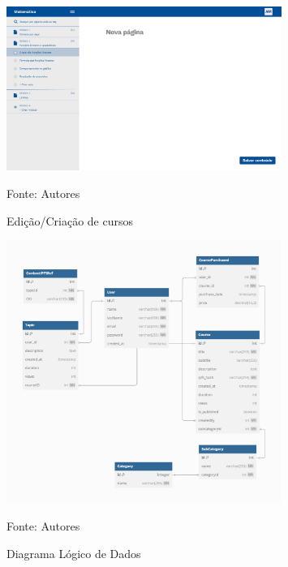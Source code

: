 \begin{apendicesenv}
    \begin{figure}[h]
        \centering
        \caption{Edição/Criação de cursos}
        \includegraphics[width=0.8\textwidth]{figuras/Criando_curso.png}
        \begin{center}
            {\footnotesize Fonte: Autores}
        \end{center}
        \label{fig:Criando_curso}
    \end{figure}

    \begin{figure}[h]
        \centering
        \caption{Diagrama Lógico de Dados}
        \includegraphics[width=0.8\textwidth]{figuras/ddl.png}
        \begin{center}
            {\footnotesize Fonte: Autores}
        \end{center}
        \label{fig:dld}
    \end{figure}


\end{apendicesenv}
